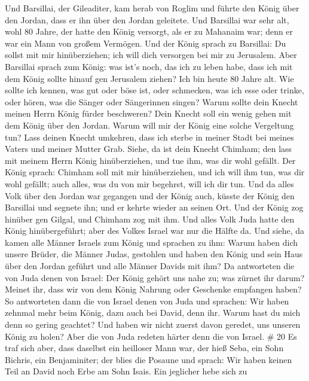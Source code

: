  Und Barsillai, der Gileaditer, kam herab von Roglim und
führte den König über den Jordan, dass er ihn über den Jordan geleitete.
 Und Barsillai war sehr alt, wohl 80 Jahre, der hatte den
König versorgt, als er zu Mahanaim war; denn er war ein Mann von großem
Vermögen.  Und der König sprach zu Barsillai: Du sollst mit
mir hinüberziehen; ich will dich versorgen bei mir zu Jerusalem.
 Aber Barsillai sprach zum König: was ist's noch, das ich
zu leben habe, dass ich mit dem König sollte hinauf gen Jerusalem
ziehen?  Ich bin heute 80 Jahre alt. Wie sollte ich kennen,
was gut oder böse ist, oder schmecken, was ich esse oder trinke, oder
hören, was die Sänger oder Sängerinnen singen? Warum sollte dein Knecht
meinen Herrn König fürder beschweren?  Dein Knecht soll ein
wenig gehen mit dem König über den Jordan. Warum will mir der König eine
solche Vergeltung tun?  Lass deinen Knecht umkehren, dass
ich sterbe in meiner Stadt bei meines Vaters und meiner Mutter Grab.
Siehe, da ist dein Knecht Chimham; den lass mit meinem Herrn König
hinüberziehen, und tue ihm, was dir wohl gefällt.  Der
König sprach: Chimham soll mit mir hinüberziehen, und ich will ihm tun,
was dir wohl gefällt; auch alles, was du von mir begehrst, will ich dir
tun.  Und da alles Volk über den Jordan war gegangen und
der König auch, küsste der König den Barsillai und segnete ihn; und er
kehrte wieder an seinen Ort.  Und der König zog hinüber gen
Gilgal, und Chimham zog mit ihm. Und alles Volk Juda hatte den König
hinübergeführt; aber des Volkes Israel war nur die Hälfte da.
 Und siehe, da kamen alle Männer Israels zum König und
sprachen zu ihm: Warum haben dich unsere Brüder, die Männer Judas,
gestohlen und haben den König und sein Haus über den Jordan geführt und
alle Männer Davids mit ihm?  Da antworteten die von Juda
denen von Israel: Der König gehört uns nahe zu; was zürnet ihr darum?
Meinet ihr, dass wir von dem König Nahrung oder Geschenke empfangen
haben?  So antworteten dann die von Israel denen von Juda
und sprachen: Wir haben zehnmal mehr beim König, dazu auch bei David,
denn ihr. Warum hast du mich denn so gering geachtet? Und haben wir
nicht zuerst davon geredet, uns unseren König zu holen? Aber die von
Juda redeten härter denn die von Israel. \# 20  Es traf sich
aber, dass daselbst ein heilloser Mann war, der hieß Seba, ein Sohn
Bichris, ein Benjaminiter; der blies die Posaune und sprach: Wir haben
keinen Teil an David noch Erbe am Sohn Isais. Ein jeglicher hebe sich zu
